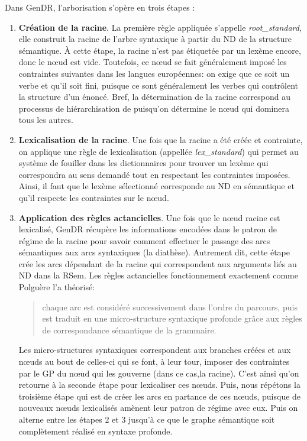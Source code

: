 Dans GenDR, l'arborisation s'opère en trois étapes \citep{lareau18}:

\begin{enumerate}
  \item \textbf{Création de la racine}.
  La première règle appliquée s'appelle \emph{root\_standard}, elle construit la racine de l'arbre syntaxique à partir du \ac{ND} de la structure sémantique. À cette étape, la racine n'est pas étiquetée par un lexème encore, donc le n\oe{}ud est vide. Toutefois, ce n\oe{}ud se fait généralement imposé les contraintes suivantes dans les langues européennes: on exige que ce soit un verbe et qu'il soit fini, puisque ce sont généralement les verbes qui contrôlent la structure d'un énoncé. Bref, la détermination de la racine correspond au processus de hiérarchisation de \cite{PolguereStructurationmisejeu1990} puisqu'on détermine le n\oe{}ud qui dominera tous les autres.

  \item \textbf{Lexicalisation de la racine}.
  Une fois que la racine a été créée et contrainte, on applique une règle de lexicalisation (appellée \emph{lex\_standard}) qui permet au système de fouiller dans les dictionnaires pour trouver un lexème qui correspondra au sens demandé tout en respectant les contraintes imposées. Ainsi, il faut que le lexème sélectionné corresponde au \ac{ND} en sémantique et qu'il respecte les contraintes sur le n\oe{}ud.

  \item \textbf{Application des règles actancielles}.
  Une fois que le n\oe{}ud racine est lexicalisé, GenDR récupère les informations encodées dans le patron de régime de la racine pour savoir comment effectuer le passage des arcs sémantiques aux arcs syntaxiques (la diathèse). Autrement dit, cette étape crée les arcs dépendant de la racine qui correspondent aux arguments liés au \ac{ND} dans la \ac{RSem}. Les règles actancielles fonctionnement exactement comme Polguère l'a théorisé:
\begin{quote}
chaque arc est considéré successivement dans l'ordre du parcours, puis est traduit en une micro-structure syntaxique profonde grâce aux règles de correspondance sémantique de la grammaire.
\end{quote}
\vspace{-\baselineskip}
\hfill
\cite[p.~273]{PolguereStructurationmisejeu1990}

Les micro-structures syntaxiques correspondent aux branches créées et aux n\oe{}uds  au bout de celles-ci qui se font, à leur tour, imposer des contraintes par le \ac{GP} du n\oe{}ud qui les gouverne (dans ce cas,la racine). C'est ainsi qu'on retourne à la seconde étape pour lexicaliser ces n\oe{}uds. Puis, nous répétons la troisième étape qui est de créer les arcs en partance de ces n\oe{}uds, puisque de nouveaux n\oe{}uds lexicalisés amènent leur patron de régime avec eux. Puis on alterne entre les étapes 2 et 3 jusqu'à ce que le graphe sémantique soit complètement réalisé en syntaxe profonde.
\end{enumerate} 

